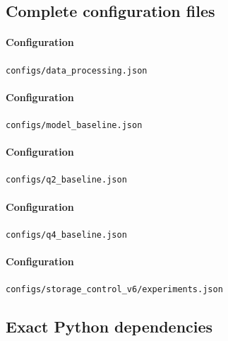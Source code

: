 

\subsection*{Complete configuration files}


\paragraph*{Configuration} \nolinkurl{configs/data_processing.json}




\paragraph*{Configuration} \nolinkurl{configs/model_baseline.json}




\paragraph*{Configuration} \nolinkurl{configs/q2_baseline.json}




\paragraph*{Configuration} \nolinkurl{configs/q4_baseline.json}




\paragraph*{Configuration} \nolinkurl{configs/storage_control_v6/experiments.json}




\subsection*{Exact Python dependencies}


